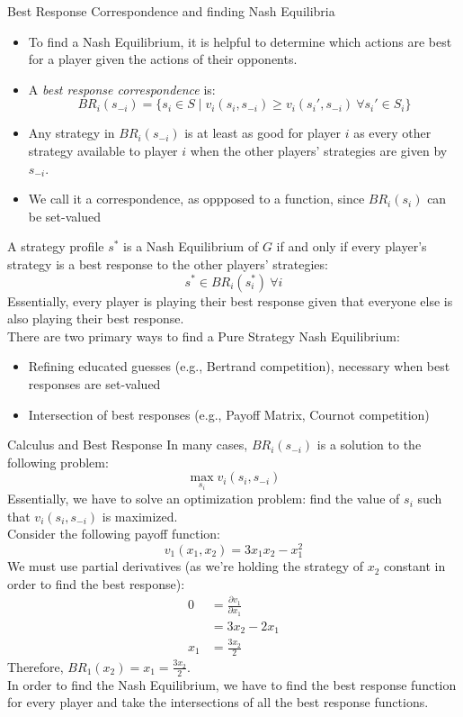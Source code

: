 \documentclass[8pt]{extarticle}
\begin{document}
  \begin{problem}{Best Response Correspondence and finding Nash Equilibria}
    \begin{itemize}
      \item To find a Nash Equilibrium, it is helpful to determine which actions are best for a player given the actions of their opponents.
      \item A \textit{best response correspondence} is:
        \[
          BR_i(s_{-i}) = \{s_i\in S\mid v_i(s_i,s_{-i}) \geq v_i(s_i', s_{-i})~\forall s_i'\in S_i\}
        \] 
      \item Any strategy in $BR_i(s_{-i})$ is at least as good for player $i$ as every other strategy available to player $i$ when the other players' strategies are given by $s_{-i}$.
      \item We call it a correspondence, as oppposed to a function, since $BR_i(s_i)$ can be set-valued
    \end{itemize}
    A strategy profile $s^*$ is a Nash Equilibrium of $G$ if and only if every player's strategy is a best response to the other players' strategies:
    \[
      s^* \in BR_i(s^*_i)~\forall i
    \] 
    Essentially, every player is playing their best response given that everyone else is also playing their best response.\\

    There are two primary ways to find a Pure Strategy Nash Equilibrium:
    \begin{itemize}
      \item Refining educated guesses (e.g., Bertrand competition), necessary when best responses are set-valued
      \item Intersection of best responses (e.g., Payoff Matrix, Cournot competition)
    \end{itemize}
  \end{problem}
  \begin{problem}{Calculus and Best Response}
    In many cases, $BR_i(s_{-i})$ is a solution to the following problem:
    \[
      \max_{s_i}v_i(s_i,s_{-i})
    \] 
    Essentially, we have to solve an optimization problem: find the value of $s_i$ such that $v_i(s_i,s_{-i})$ is maximized.\\

    Consider the following payoff function:
    \[
      v_1(x_1,x_2) = 3x_1x_2 - x_1^2
    \] 
    We must use partial derivatives (as we're holding the strategy of $x_2$ constant in order to find the best response):
    \begin{align*}
      0 &= \frac{\partial v_1}{\partial x_1}\\
        &= 3x_2 - 2x_1\\
      x_1 &= \frac{3x_2}{2}
    \end{align*}
    Therefore, $BR_1(x_2) = x_1 = \frac{3x_2}{2}$.\\

    In order to find the Nash Equilibrium, we have to find the best response function for every player and take the intersections of all the best response functions.
  \end{problem}
\end{document}
